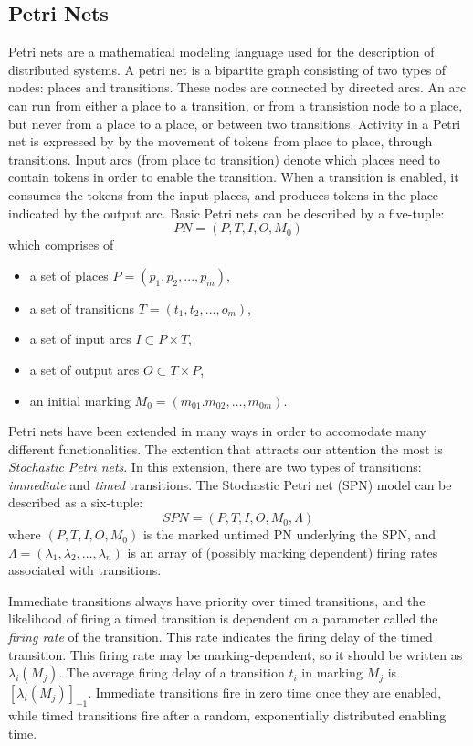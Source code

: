 \documentclass[11pt]{book}
\begin{document}
\subsection{Petri Nets}
Petri nets are a mathematical modeling language used for the description of distributed systems. A petri net is a bipartite graph consisting of two types of nodes: places and transitions. These nodes are connected by directed arcs. An arc can run from either a place to a transition, or from a transistion node to a place, but never from a place to a place, or between two transitions. Activity in a Petri net is expressed by by the movement of tokens from place to place, through transitions. Input arcs (from place to transition) denote which places need to contain tokens in order to enable the transition. When a transition is enabled, it consumes the tokens from the input places, and produces tokens in the place indicated by the output arc.
Basic Petri nets can be described by a five-tuple:
\begin{equation}
PN = (P,T,I,O,M_0)
\end{equation}
which comprises of
\begin{itemize}
\item a set of places $P = (p_1, p_2, ..., p_m)$,
\item a set of transitions $T = (t_1, t_2, ...,o_m)$,
\item a set of input arcs $I \subset P \times T$,
\item a set of output arcs $O \subset T \times P$,
\item an initial marking $M_0 = (m_{01}. m_{02}, \ldots, m_{0m})$.

\end{itemize}

Petri nets have been extended in many ways in order to accomodate many different functionalities. The extention that attracts our attention the most is \emph{Stochastic Petri nets}. In this extension, there are two types of transitions: \emph{immediate} and \emph{timed} transitions.
The Stochastic Petri net (SPN) model can be described as a six-tuple:
\begin{equation}
SPN = (P,T,I,O,M_0,\Lambda)
\end{equation}
where $(P,T,I,O,M_0)$ is the marked untimed PN underlying the SPN, and $\Lambda = (\lambda_1, \lambda_2, \ldots, \lambda_n)$ is an array of (possibly marking dependent) firing rates associated with transitions.

Immediate transitions always have priority over timed transitions, and  the likelihood of firing a timed transition is dependent on a parameter called the \emph{firing rate} of the transition. This rate indicates the firing delay of the timed transition. This firing rate may be marking-dependent, so it should be written as $\lambda_i(M_j)$.  The average firing delay of a transition $t_i$ in marking $M_j$ is $[\lambda_i(M_j)]_{-1}$. Immediate transitions fire in zero time once they are enabled, while timed transitions fire after a random, exponentially distributed enabling time.
\end{document}
